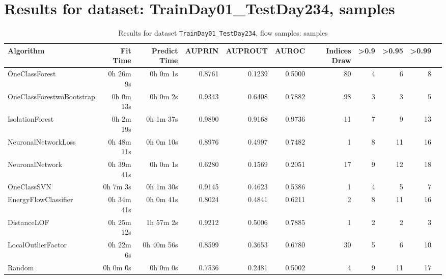 \documentclass{article}
\begin{document}
\section*{Results for dataset: TrainDay01_TestDay234, samples}
\begin{table}[h!]
\centering
\caption{Results for dataset \texttt{TrainDay01_TestDay234}, flow samples: samples}
\label{tab:trainday01testday234_samples}
\begin{tabular}{lrrrrrrrrrr}
\toprule
Algorithm & Fit Time & Predict Time & AUPRIN & AUPROUT & AUROC & Indices Draw & >0.9 & >0.95 & >0.99 \\
\midrule
OneClassForest & 0h 26m 9s & 0h 0m 1s & 0.8761 & 0.1239 & 0.5000 & 80 & 4 & 6 & 8 \\
OneClassForestwoBootstrap & 0h 0m 13s & 0h 0m 2s & 0.9343 & 0.6408 & 0.7882 & 98 & 3 & 3 & 5 \\
IsolationForest & 0h 2m 19s & 0h 1m 37s & 0.9890 & 0.9168 & 0.9736 & 11 & 7 & 9 & 13 \\
NeuronalNetworkLoss & 0h 48m 11s & 0h 0m 10s & 0.8976 & 0.4997 & 0.7482 & 1 & 8 & 11 & 16 \\
NeuronalNetwork & 0h 39m 41s & 0h 0m 1s & 0.6280 & 0.1569 & 0.2051 & 17 & 9 & 12 & 18 \\
OneClassSVN & 0h 7m 3s & 0h 1m 30s & 0.9145 & 0.4623 & 0.5386 & 1 & 4 & 5 & 7 \\
EnergyFlowClassifier & 0h 34m 41s & 0h 0m 41s & 0.8024 & 0.4841 & 0.6211 & 2 & 8 & 11 & 16 \\
DistanceLOF & 0h 25m 12s & 1h 57m 2s & 0.9212 & 0.5006 & 0.7885 & 1 & 2 & 2 & 3 \\
LocalOutlierFactor & 0h 22m 6s & 0h 40m 56s & 0.8599 & 0.3653 & 0.6780 & 30 & 5 & 6 & 10 \\
Random & 0h 0m 0s & 0h 0m 0s & 0.7536 & 0.2481 & 0.5002 & 4 & 9 & 11 & 17 \\
\bottomrule
\end{tabular}
\end{table}
\end{document}
